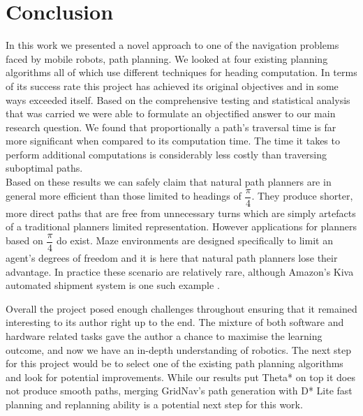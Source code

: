 \chapter{Conclusion}

\noindent
In this work we presented a novel approach to one of the navigation problems faced by mobile robots, path planning. We looked at four existing planning algorithms all of which use different techniques for heading computation. In terms of its success rate this project has achieved its original objectives and in some ways exceeded itself. Based on the comprehensive testing and statistical analysis that was carried we were able to formulate an objectified answer to our main research question. We found that proportionally a path's traversal time is far more significant when compared to its computation time. The time it takes to perform additional computations is considerably less costly than traversing suboptimal paths. \\

\noindent
Based on these results we can safely claim that natural path planners are in general more efficient than those limited to headings of $\dfrac{\pi}{4}$. They produce shorter, more direct paths that are free from unnecessary turns which are simply artefacts of a traditional planners limited representation. However applications for planners based on $\dfrac{\pi}{4}$ do exist. Maze environments are designed specifically to limit an agent's degrees of freedom and it is here that natural path planners lose their advantage. In practice these scenario are relatively rare, although Amazon's Kiva automated shipment system is one such example \cite{AZK12}. 

\newpage

\noindent
Overall the project posed enough challenges throughout ensuring that it remained interesting to its author right up to the end. The mixture of both software and hardware related tasks gave the author a chance to maximise the learning outcome, and now we have an in-depth understanding of robotics. The next step for this project would be to select one of the existing path planning algorithms and look for potential improvements. While our results put Theta* on top it does not produce smooth paths, merging GridNav's path generation with D* Lite fast planning and replanning ability is a potential next step for this work.
